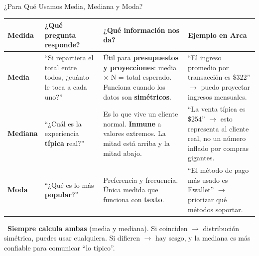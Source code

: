 \documentclass[aspectratio=169, 11pt]{beamer}
\begin{document}
\begin{frame}[shrink=8]{¿Para Qué Usamos Media, Mediana y Moda?}
  \vspace{-4pt}
  {\scriptsize
  \begin{tabular}{@{}p{1.6cm}p{3cm}p{4cm}p{4cm}@{}}
    \toprule
    \textbf{Medida} & \textbf{¿Qué pregunta responde?} & \textbf{¿Qué información nos da?} & \textbf{Ejemplo en Arca} \\
    \midrule
    \textbf{Media} &
      ``Si repartiera el total entre todos, ¿cuánto le toca a cada uno?'' &
      Útil para \textbf{presupuestos y proyecciones}: media $\times$ N = total esperado.
      Funciona cuando los datos son \textbf{simétricos}. &
      ``El ingreso promedio por transacción es \$322'' $\to$ puedo proyectar ingresos mensuales. \\[4pt]
    \textbf{Mediana} &
      ``¿Cuál es la experiencia \textbf{típica} real?'' &
      Es lo que vive un cliente normal. \textbf{Inmune} a valores extremos.
      La mitad está arriba y la mitad abajo. &
      ``La venta típica es \$254'' $\to$ esto representa al cliente real, no un número inflado por compras gigantes. \\[4pt]
    \textbf{Moda} &
      ``¿Qué es lo más \textbf{popular}?'' &
      Preferencia y frecuencia. Única medida que funciona con \textbf{texto}. &
      ``El método de pago más usado es Ewallet'' $\to$ priorizar qué métodos soportar. \\
    \bottomrule
  \end{tabular}
  }

  \vspace{4pt}
  {\scriptsize\color{textMuted}
    \faLightbulb\ \textbf{Siempre calcula ambas} (media y mediana).
    Si coinciden $\to$ distribución simétrica, puedes usar cualquiera.
    Si difieren $\to$ hay sesgo, y la mediana es más confiable para comunicar ``lo típico''.}
\end{frame}
\end{document}
